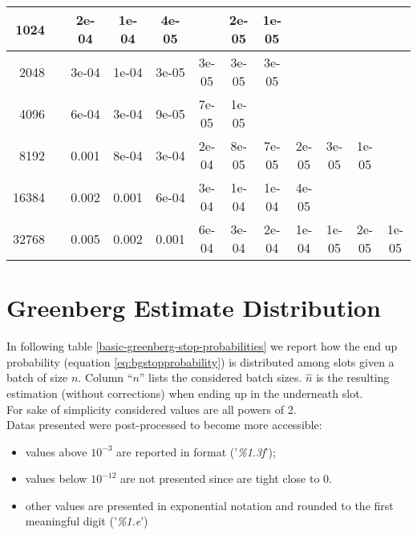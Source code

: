 \begin{appendices}
\begin{table}[H]
{\begin{tabular}{r|ccccccccccc}
1024 &&2e-04 &1e-04 &4e-05 &&2e-05 &1e-05 &&&&\\\hline

2048 &&3e-04 &1e-04 &3e-05 &3e-05 &3e-05 &3e-05 &&&&\\\hline

4096 &&6e-04 &3e-04 &9e-05 &7e-05 &1e-05 &&&&&\\\hline

8192 &&0.001 &8e-04 &3e-04 &2e-04 &8e-05 &7e-05 &2e-05 &3e-05 &1e-05 &\\\hline

16384 &&0.002 &0.001 &6e-04 &3e-04 &1e-04 &1e-04 &4e-05 &&&\\\hline

32768 &&0.005 &0.002 &0.001 &6e-04 &3e-04 &2e-04 &1e-04 &1e-05 &2e-05 &1e-05\\\hline

\end{tabular}
}
\end{table}

%
%
%
%

\section{Greenberg Estimate Distribution}
In following table \ref{basic-greenberg-stop-probabilities} we report how the end  up probability (equation \ref{eq:bgstopprobability}) is distributed among slots given a batch of size $n$.  Column ``$n$'' lists  the considered batch sizes. $\hat{n}$ is the resulting estimation (without corrections) when ending up in the underneath slot.\\  For sake of simplicity considered values are all powers of 2.\\
Datas presented were post-processed to become more accessible:
\begin{itemize}
\item values above $10^{-3}$ are reported in format ('\emph{\%1.3f}');
\item values below $10^{-12}$ are not presented since are tight close to 0.
\item other values are presented in exponential notation and rounded to the first meaningful digit ('\emph{\%1.e}')
\end{itemize}



\begin{sidewaystable}
\flushleft
{}
\end{sidewaystable}
\end{appendices}
